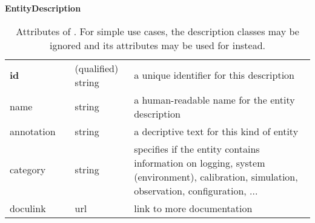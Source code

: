 \begin{table}[h]
\small
{}\textwidth
\textbf{\normalsize EntityDescription}\vspace{0.25em}\\
\begin{tabulary}{\textwidth}{@{}p{2.75cm}p{0cm}p{2cm}L@{}}
\toprule
{} & \head{} &  & \\
\midrule
\textbf{id} & & (qualified) string & a unique identifier for this description\\
name       & & string & a human-readable name for the entity description\\
annotation  & & string & a decriptive text for this kind of entity\\
category    & & string & specifies if the entity contains information on logging, system (environment), calibration, simulation, observation, configuration, ...\\
doculink    & & url & link to more documentation\\
\bottomrule
\end{tabulary}
\caption{Attributes of . For simple use cases, 
the description classes may be ignored and its attributes may be used for 
 instead. 
}\label{tab:entitydescription-attributes}
\end{table}


